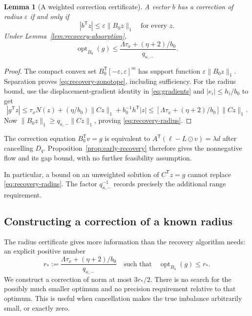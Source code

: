 \documentclass[11pt]{article}
\newtheorem{lemma}[theorem]{Lemma}
\theoremstyle{definition}\newtheorem{definition}[theorem]{Definition}
\theoremstyle{remark}\newtheorem{remark}[theorem]{Remark}
\begin{document}
\begin{lemma}[A weighted correction certificate]
\label{lem:recovery-radius}
A vector $b$ has a correction of radius $\varepsilon$ if and only if
\begin{equation}\label{eq:recovery-zonotope}
 |b^{\mathsf T}z|\le\varepsilon\|B_0z\|_1\quad\text{for every }z.
\end{equation}
Under Lemma~\ref{lem:recovery-absorption},
\begin{equation}\label{eq:recovery-radius}
 \operatorname{opt}_{B_0}(g)
 \le\frac{\Lambda\tau_x+(\eta+2)/b_0}{q_{\kappa,-}}.
\end{equation}
\end{lemma}

\begin{proof}
The compact convex set $B_0^{\mathsf T}[-\varepsilon,\varepsilon]^m$
has support function $\varepsilon\|B_0z\|_1$. Separation proves
\eqref{eq:recovery-zonotope}, including sufficiency.
For the radius bound, use the displacement-gradient identity in
\eqref{eq:gradients} and
$|e_i|\le h_i/b_0$ to get
\[
 |g^{\mathsf T}z|
 \le\tau_xN(z)+(\eta/b_0)\|Cz\|_1+b_0^{-1}h^{\mathsf T}|z|
 \le[\Lambda\tau_x+(\eta+2)/b_0]\|Cz\|_1.
\]
Now $\|B_0z\|_1\ge q_{\kappa,-}\|Cz\|_1$, proving
\eqref{eq:recovery-radius}.
\end{proof}

The correction equation $B_0^{\mathsf T}v=g$ is equivalent to
$A^{\mathsf T}(\ell-L\odot v)=\lambda d$ after cancelling $D_q$.
Proposition~\ref{prop:early-recovery} therefore gives the nonnegative
flow and its gap bound, with no further feasibility assumption.

In particular, a bound on an unweighted solution of $C^{\mathsf T}z=g$
cannot replace \eqref{eq:recovery-radius}. The factor
$q_{\kappa,-}^{-1}$ records precisely the additional range requirement.

\subsection{Constructing a correction of a known radius}

The radius certificate gives more information than the recovery algorithm
needs: an explicit positive number
\[
 r_*:=\frac{\Lambda\tau_x+(\eta+2)/b_0}{q_{\kappa,-}}
 \quad\text{such that}\quad \operatorname{opt}_{B_0}(g)\le r_*.
\]
We construct a correction of norm at most $3r_*/2$. There is no search for
the possibly much smaller optimum and no precision requirement relative
to that optimum. This is useful when cancellation makes the true
imbalance arbitrarily small, or exactly zero.
\end{document}
